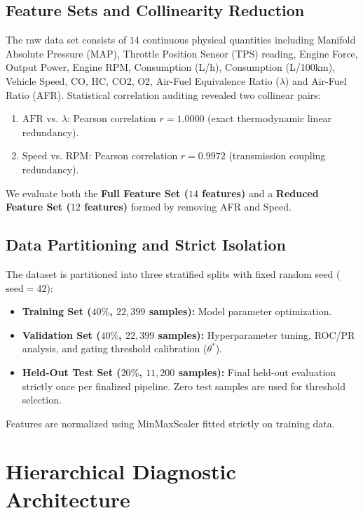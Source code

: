 \documentclass[journal]{IEEEtran}
\begin{document}
\subsection{Feature Sets and Collinearity Reduction}
The raw data set consists of $14$ continuous physical quantities including Manifold Absolute Pressure (MAP), Throttle Position Sensor (TPS) reading, Engine Force, Output Power, Engine RPM, Consumption (L/h), Consumption (L/100km), Vehicle Speed, CO, HC, CO2, O2, Air-Fuel Equivalence Ratio ($\lambda$) and Air-Fuel Ratio (AFR). Statistical correlation auditing revealed two collinear pairs:
\begin{enumerate}
    \item $\text{AFR}$ vs. $\lambda$: Pearson correlation $r = 1.0000$ (exact thermodynamic linear redundancy).
    \item $\text{Speed}$ vs. $\text{RPM}$: Pearson correlation $r = 0.9972$ (transmission coupling redundancy).
\end{enumerate}
We evaluate both the \textbf{Full Feature Set ($14$ features)} and a \textbf{Reduced Feature Set ($12$ features)} formed by removing AFR and Speed.

\subsection{Data Partitioning and Strict Isolation}
The dataset is partitioned into three stratified splits with fixed random seed ($\text{seed}=42$):
\begin{itemize}
    \item \textbf{Training Set ($40\%$, $22,399$ samples):} Model parameter optimization.
    \item \textbf{Validation Set ($40\%$, $22,399$ samples):} Hyperparameter tuning, ROC/PR analysis, and gating threshold calibration ($\theta^*$).
    \item \textbf{Held-Out Test Set ($20\%$, $11,200$ samples):} Final held-out evaluation strictly once per finalized pipeline. Zero test samples are used for threshold selection.
\end{itemize}
Features are normalized using MinMaxScaler fitted strictly on training data.

\section{Hierarchical Diagnostic Architecture}
\end{document}
